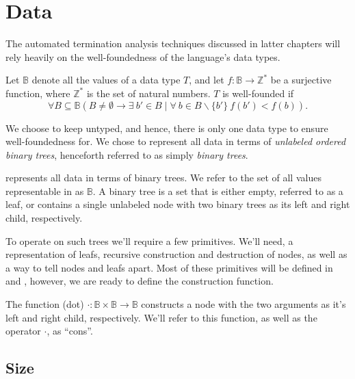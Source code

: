 \section{Data}

The automated termination analysis techniques discussed in latter chapters will
rely heavily on the well-foundedness of the language's data types.

\begin{definition}\label{definition:well-foundedness} Let $\mathbb{B}$ denote
all the values of a data type $T$, and let $f:\mathbb{B}\rightarrow \mathbb{Z}^*$
be a surjective function, where $\mathbb{Z}^*$ is the set of natural numbers. $T$
is well-founded if $$\forall B\subseteq \mathbb{B} \left( B \neq \emptyset
\rightarrow \exists\ b' \in B \mid \forall\ b\in B\backslash\{b'\}\ f(b') <
f(b)\right).$$\end{definition}

We choose to keep \D{} untyped, and hence, there is only one data type to
ensure well-foundedness for. We chose to represent all data in terms of
\emph{unlabeled ordered binary trees}, henceforth referred to as simply
\emph{binary trees}.

\begin{definition}\label{definition:values} \D{} represents all data in terms
of binary trees. We refer to the set of all values representable in \D{} as
$\mathbb{B}$. A binary tree is a set that is either empty, referred to as a
leaf, or contains a single unlabeled node with two binary trees as its left and
right child, respectively.\end{definition}

To operate on such trees we'll require a few primitives. We'll need, a
representation of leafs, recursive construction and destruction of nodes, as
well as a way to tell nodes and leafs apart. Most of these primitives will be
defined in  and , however, we
are ready to define the construction function.

\begin{definition} The function (dot) $\cdot
:\mathbb{B}\times\mathbb{B}\rightarrow\mathbb{B}$ constructs a node with the
two arguments as it's left and right child, respectively. We'll refer to this
function, as well as the operator $\cdot$, as ``cons''.\end{definition}

\subsection{Size}

